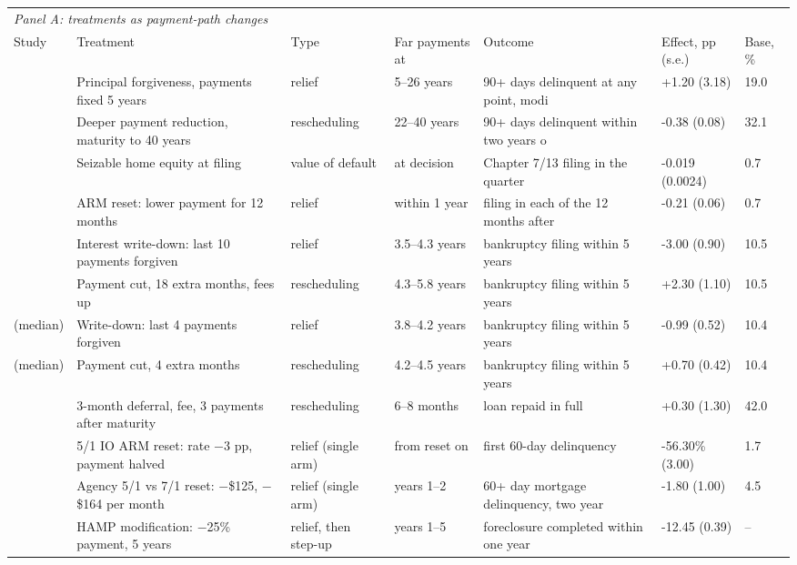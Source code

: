 \begin{tabular}{lllllll}
\toprule
\multicolumn{7}{l}{\textit{Panel A: treatments as payment-path changes}} \\
Study & Treatment & Type & Far payments at & Outcome & Effect, pp (s.e.) & Base, \% \\
\midrule
\citet{ganong_liquidity_2020} & Principal forgiveness, payments fixed 5 years & relief & 5--26 years & 90+ days delinquent at any point, modi & +1.20 (3.18) & 19.0 \\
\citet{ganong_liquidity_2020} & Deeper payment reduction, maturity to 40 years & rescheduling & 22--40 years & 90+ days delinquent within two years o & -0.38 (0.08) & 32.1 \\
\citet{indarte_moral_2023} & Seizable home equity at filing & value of default & at decision & Chapter 7/13 filing in the quarter & -0.019 (0.0024) & 0.7 \\
\citet{indarte_moral_2023} & ARM reset: lower payment for 12 months & relief & within 1 year & filing in each of the 12 months after  & -0.21 (0.06) & 0.7 \\
\citet{dobbie_targeted_2020} & Interest write-down: last 10 payments forgiven & relief & 3.5--4.3 years & bankruptcy filing within 5 years & -3.00 (0.90) & 10.5 \\
\citet{dobbie_targeted_2020} & Payment cut, 18 extra months, fees up & rescheduling & 4.3--5.8 years & bankruptcy filing within 5 years & +2.30 (1.10) & 10.5 \\
\citet{dobbie_targeted_2020} (median) & Write-down: last 4 payments forgiven & relief & 3.8--4.2 years & bankruptcy filing within 5 years & -0.99 (0.52) & 10.4 \\
\citet{dobbie_targeted_2020} (median) & Payment cut, 4 extra months & rescheduling & 4.2--4.5 years & bankruptcy filing within 5 years & +0.70 (0.42) & 10.4 \\
\citet{fiorin_moratorium_2026} & 3-month deferral, fee, 3 payments after maturity & rescheduling & 6--8 months & loan repaid in full & +0.30 (1.30) & 42.0 \\
\citet{fuster_payment_2017} & 5/1 IO ARM reset: rate $-$3 pp, payment halved & relief (single arm) & from reset on & first 60-day delinquency & -56.30\% (3.00) & 1.7 \\
\citet{keys_mortgage_2014} & Agency 5/1 vs 7/1 reset: $-$\$125, $-$\$164 per month & relief (single arm) & years 1--2 & 60+ day mortgage delinquency, two year & -1.80 (1.00) & 4.5 \\
\citet{agarwal_policy_2017} & HAMP modification: $-$25\% payment, 5 years & relief, then step-up & years 1--5 & foreclosure completed within one year  & -12.45 (0.39) & -- \\

\end{tabular}
